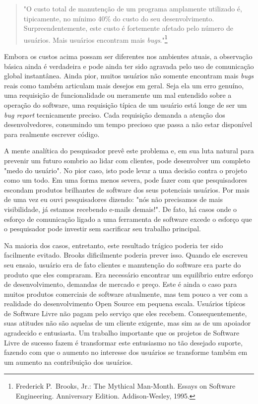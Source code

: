 %
\begin{quote}
"O custo total de manutenção de um programa amplamente utilizado é, tipicamente,
no mínimo 40\% do custo do seu desenvolvimento. Surpreendentemente, este custo é
fortemente afetado pelo número de usuários. Mais usuários encontram mais \textit{bugs}."\footnote{
Frederick P.\ Brooks, Jr.: The Mythical Man-Month. Essays on Software Engineering. Anniversary
Edition. Addison-Wesley, 1995.}
\end{quote}
%
Embora os custos acima possam ser diferentes nos ambientes atuais, a observação básica
ainda é verdadeira e pode ainda ter sido agravada pelo uso de comunicação global
instantânea. Ainda pior, muitos usuários não somente encontram mais \textit{bugs} reais
como também articulam mais desejos em geral. Seja ela um erro genuíno, uma requisição de
funcionalidade ou meramente um mal entendido sobre a operação do software, uma requisição
típica de um usuário está longe de ser um \textit{bug report} tecnicamente preciso. Cada
requisição demanda a atenção dos desenvolvedores, consumindo um tempo precioso que passa a
não estar disponível para realmente escrever código.

A mente analítica do pesquisador prevê este problema e, em sua luta natural para prevenir
um futuro sombrio ao lidar com clientes, pode desenvolver um completo "medo do usuário".
No pior caso, isto pode levar a uma decisão contra o projeto como um todo. Em uma forma
menos severa, pode fazer com que pesquisadores escondam produtos brilhantes de software
dos seus potenciais usuários. Por mais de uma vez eu ouvi pesquisadores dizendo: "nós não
precisamos de mais visibilidade, já estamos recebendo e-mails demais!". De fato, há casos
onde o esforço de comunicação ligado a uma ferramenta de software excede o esforço que o
pesquisador pode investir sem sacrificar seu trabalho principal.

Na maioria dos casos, entretanto, este resultado trágico poderia ter sido facilmente evitado.
Brooks dificilmente poderia prever isso. Quando ele escreveu seu ensaio, usuário era de fato
clientes e manutenção do software era parte do produto que eles compraram. Era necessário
encontrar um equilíbrio entre esforço de desenvolvimento, demandas de mercado e preço.
Este é ainda o caso para muitos produtos comerciais de software atualmente, mas tem pouco a
ver com a realidade do desenvolvimento Open Source em pequena escala. Usuários típicos de
Software Livre não pagam pelo serviço que eles recebem. Consequentemente, suas atitudes não
são aquelas de um cliente exigente, mas sim as de um apoiador agradecido e entusiasta.
Um trabalho importante que os projetos de Software Livre de sucesso fazem é transformar
este entusiasmo no tão desejado suporte, fazendo com que o aumento no interesse dos usuários
se transforme também em um aumento na contribuição dos usuários.

